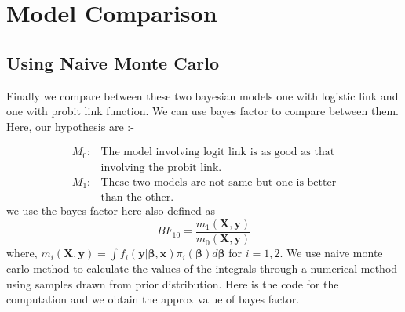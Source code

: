 \documentclass[11pt,english]{article}\usepackage[]{graphicx}\usepackage[]{xcolor}
\begin{document}
\section*{Model Comparison}

\subsection*{Using Naive Monte Carlo}

Finally we compare between these two bayesian models one with logistic
link and one with probit link function. We can use bayes factor to
compare between them. Here, our hypothesis are :-

\begin{align*}
M_{0}: & \text{The model involving logit link is as good as that}\\
 & \text{involving the probit link.}\\
M_{1}: & \text{These two models are not same but one is better}\\
 & \text{than the other.}
\end{align*}
 we use the bayes factor here also defined as 
\[
BF_{10}=\frac{m_{1}\left(\boldsymbol{X,y}\right)}{m_{0}\left(\boldsymbol{X,y}\right)}
\]
 where, $m_{i}\left(\boldsymbol{X,y}\right)=\int f_{i}\left(\boldsymbol{y}|\boldsymbol{\beta},\boldsymbol{x}\right)\pi_{i}\left(\boldsymbol{\beta}\right)d\boldsymbol{\beta}$
for $i=1,2$. We use naive monte carlo method to calculate the values
of the integrals through a numerical method using samples drawn from
prior distribution. Here is the code for the computation and we obtain
the approx value of bayes factor.
\end{document}

